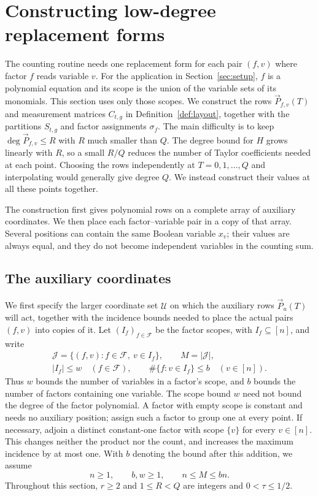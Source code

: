 \section{Constructing low-degree replacement forms}\label{sec:construction}
The counting routine needs one replacement form for each pair $(f,v)$
where factor $f$ reads variable $v$. For the application in
Section~\ref{sec:setup}, $f$ is a polynomial equation and its scope is
the union of the variable sets of its monomials. This section uses
only those scopes.
We construct the rows $\vec{P}_{f,v}(T)$ and measurement matrices $C_{t,g}$
in Definition~\ref{def:layout}, together with the partitions $S_{t,g}$
and factor assignments $\sigma_f$. The main difficulty is to keep
$\deg \vec{P}_{f,v}\le R$ with $R$ much smaller than $Q$. The degree bound
for $H$ grows linearly with $R$, so a small $R/Q$ reduces the number
of Taylor coefficients needed at each point. Choosing the rows
independently at $T=0,1,\ldots,Q$ and interpolating would generally give
degree $Q$. We instead construct their values at all these points together.

The construction first gives polynomial rows on a complete array of
auxiliary coordinates. We then place each factor--variable pair in a
copy of that array. Several positions can contain the same Boolean
variable $x_v$; their values are always equal, and they do not become
independent variables in the counting sum.

\subsection{The auxiliary coordinates}\label{subsec:incidence-layout}
We first specify the larger coordinate set $\mathcal U$ on which
the auxiliary rows $\vec{P}_u(T)$ will act, together with the incidence
bounds needed to place the actual pairs $(f,v)$ into copies of it.
Let $(I_f)_{f\in\mathcal F}$ be the factor scopes, with $I_f\subseteq[n]$,
and write
\begin{equation}\label{eq:factor-incidences}
 \begin{gathered}
 \mathcal J=\{(f,v):f\in\mathcal F,\ v\in I_f\},\qquad M=|\mathcal J|,\\
 |I_f|\le w\quad(f\in\mathcal F),\qquad
 \#\{f:v\in I_f\}\le b\quad(v\in[n]).
 \end{gathered}
\end{equation}
Thus $w$ bounds the number of variables in a factor's scope, and $b$
bounds the number of factors containing one variable. The scope bound
$w$ need not bound the degree of the factor polynomial. A factor with
empty scope is constant and needs no auxiliary position; assign such
a factor to group one at every point. If necessary, adjoin a distinct
constant-one factor with scope $\{v\}$ for every $v\in[n]$. This changes
neither the product nor the count, and increases the maximum incidence
by at most one. With $b$ denoting the bound after this addition, we assume
\[
 n\ge1,\qquad b,w\ge1,\qquad n\le M\le bn.
\]
Throughout this section, $r\ge2$ and $1\le R<Q$ are integers and
$0<\tau\le1/2$.

